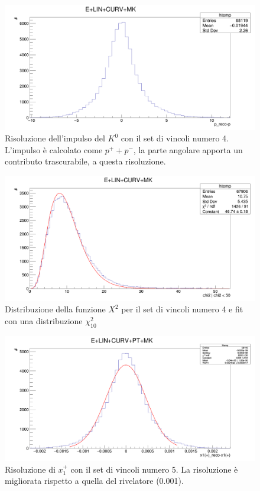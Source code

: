 \documentclass[8pt]{extarticle}
\begin{document}
\begin{figure}
	\begin{center}
		\includegraphics[scale=0.25]{set_4_p} 
		\caption{Risoluzione dell'impulso del $K^0$ con il set di vincoli numero 4. L'impulso è calcolato come $p^+ + p^-$, la parte angolare apporta un contributo trascurabile, a questa risoluzione.}
		\label{fig:set_4_p}
	\end{center}
\end{figure}

\begin{figure}
	\begin{center}
		\includegraphics[scale=0.25]{set_4_chi2} 
		\caption{Distribuzione della funzione $X^2$ per il set di vincoli numero 4 e fit con una distribuzione $\chi^2_{10}$}
		\label{fig:set_4_chi2}
	\end{center}
\end{figure}

\begin{figure}
	\begin{center}
		\includegraphics[scale=0.25]{set_5_x} 
		\caption{Risoluzione di $x_1^+$ con il set di vincoli numero 5. La risoluzione è migliorata rispetto a quella del rivelatore (0.001).}
		\label{fig:set_5_x}
	\end{center}
\end{figure}
\end{document}
